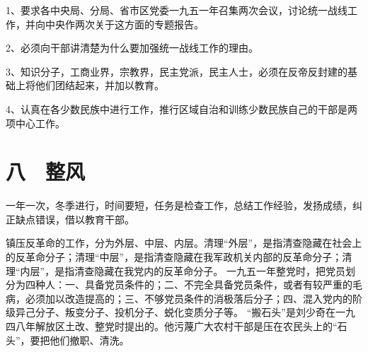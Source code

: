 1、要求各中央局、分局、省市区党委一九五一年召集两次会议，讨论统一战线工作，并向中央作两次关于这方面的专题报告。

2、必须向干部讲清楚为什么要加强统一战线工作的理由。

3、知识分子，工商业界，宗教界，民主党派，民主人士，必须在反帝反封建的基础上将他们团结起来，并加以教育。

4、认真在各少数民族中进行工作，推行区域自治和训练少数民族自己的干部是两项中心工作。

\section{八　整风}

一年一次，冬季进行，时间要短，任务是检查工作，总结工作经验，发扬成绩，纠正缺点错误，借以教育干部。


\begin{maonote}
镇压反革命的工作，分为外层、中层、内层。清理“外层”，是指清查隐藏在社会上的反革命分子；清理“中层”，是指清查隐藏在我军政机关内部的反革命分子；清理“内层”，是指清查隐藏在我党内的反革命分子。
一九五一年整党时，把党员划分为四种人：一、具备党员条件的；二、不完全具备党员条件，或者有较严重的毛病，必须加以改造提高的；三、不够党员条件的消极落后分子；四、混入党内的阶级异己分子、叛变分子、投机分子、蜕化变质分子等。
“搬石头”是刘少奇在一九四八年解放区土改、整党时提出的。他污蔑广大农村干部是压在农民头上的“石头”，要把他们撤职、清洗。
\end{maonote}
